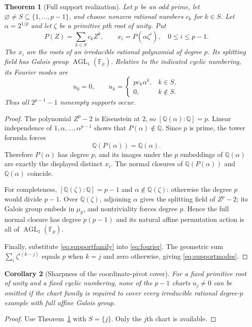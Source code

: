 \documentclass[11pt,a4paper]{article}
\newtheorem{theorem}{Theorem}[section]
\newtheorem{corollary}[theorem]{Corollary}
\theoremstyle{definition}
\theoremstyle{remark}
\newcommand{\Q}{\mathbb Q}
\newcommand{\F}{\mathbb F}
\newcommand{\AGL}{\operatorname{AGL}}
\begin{document}
\begin{theorem}[Full support realization]\label{thm:support}
Let $p$ be an odd prime, let
$\varnothing\neq S\subseteq\{1,\ldots,p-1\}$, and choose nonzero rational
numbers $c_k$ for $k\in S$. Let $\alpha=2^{1/p}$ and let $\zeta$ be a
primitive $p$th root of unity. Put
\begin{equation}
 P(Z)=\sum_{k\in S}c_k Z^k,\qquad
 x_i=P(\alpha\zeta^i),\quad 0\leq i\leq p-1.
 \label{eq:supportfamily}
\end{equation}
The $x_i$ are the roots of an irreducible rational polynomial of degree $p$.
Its splitting field has Galois group $\AGL_1(\F_p)$. Relative to the
indicated cyclic numbering, its Fourier modes are
\begin{equation}
 u_0=0,\qquad
 u_k=\begin{cases}p c_k\alpha^k,&k\in S,\\0,&k\notin S.
 \end{cases}
 \label{eq:supportmodes}
\end{equation}
Thus all $2^{p-1}-1$ nonempty supports occur.
\end{theorem}
\begin{proof}
The polynomial $Z^p-2$ is Eisenstein at $2$, so
$[\Q(\alpha):\Q]=p$. Linear independence of
$1,\alpha,\ldots,\alpha^{p-1}$ shows that $P(\alpha)\notin\Q$.
Since $p$ is prime, the tower formula forces
\[
 \Q(P(\alpha))=\Q(\alpha).
\]
Therefore $P(\alpha)$ has degree $p$, and its images under the $p$
embeddings of $\Q(\alpha)$ are exactly the displayed distinct $x_i$.
The normal closures of $\Q(P(\alpha))$ and $\Q(\alpha)$ coincide.

For completeness, $[\Q(\zeta):\Q]=p-1$ and $\alpha\notin\Q(\zeta)$:
otherwise the degree $p$ would divide $p-1$. Over $\Q(\zeta)$, adjoining
$\alpha$ gives the splitting field of $Z^p-2$; its Galois group embeds in
$\mu_p$, and nontriviality forces degree $p$. Hence the full normal closure
has degree $p(p-1)$ and its natural affine permutation action is all of
$\AGL_1(\F_p)$.

Finally, substitute \eqref{eq:supportfamily} into \eqref{eq:fourier}.
The geometric sum
$\sum_i\zeta^{i(k-j)}$ equals $p$ when $k=j$ and zero otherwise,
giving \eqref{eq:supportmodes}.
\end{proof}

\begin{corollary}[Sharpness of the coordinate-pivot cover]\label{cor:charts}
For a fixed primitive root of unity and a fixed cyclic numbering, none of
the $p-1$ charts $u_j\neq0$ can be omitted if the chart family is required
to cover every irreducible rational degree-$p$ example with full affine
Galois group.
\end{corollary}
\begin{proof}
Use Theorem~\ref{thm:support} with $S=\{j\}$. Only the $j$th chart is
available.
\end{proof}
\end{document}
